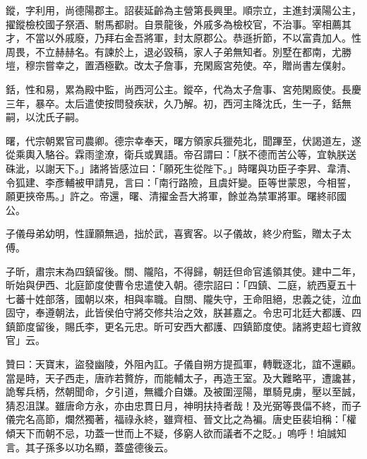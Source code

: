 \begin{pinyinscope}
 鏦，字利用，尚德陽郡主。詔裴延齡為主營第長興里。順宗立，主進封漢陽公主，擢鏦檢校國子祭酒、駙馬都尉。自景龍後，外戚多為檢校官，不治事。宰相薦其才，不當以外戚廢，乃拜右金吾將軍，封太原郡公。恭遜折節，不以富貴加人。性周畏，不立赫赫名。有諫於上，退必毀稿，家人子弟無知者。別墅在都南，尤勝塏，穆宗嘗幸之，置酒極歡。改太子詹事，充閑廄宮苑使。卒，贈尚書左僕射。



 銛，性和易，累為殿中監，尚西河公主。鏦卒，代為太子詹事、宮苑閑廄使。長慶三年，暴卒。太后遣使按問發疾狀，久乃解。初，西河主降沈氏，生一子，銛無嗣，以沈氏子嗣。



 曙，代宗朝累官司農卿。德宗幸奉天，曙方領家兵獵苑北，聞蹕至，伏謁道左，遂從乘輿入駱谷。霖雨塗潦，衛兵或異語。帝召謂曰：「朕不德而苦公等，宜執朕送硃泚，以謝天下。」諸將皆感泣曰：「願死生從陛下。」時曙與功臣子李昇、韋清、令狐建、李彥輔被甲請見，言曰：「南行路險，且虞奸變。臣等世蒙恩，今相誓，願更挾帝馬。」許之。帝還，曙、清擢金吾大將軍，餘並為禁軍將軍。曙終祁國公。



 子儀母弟幼明，性謹願無過，拙於武，喜賓客。以子儀故，終少府監，贈太子太傅。



 子昕，肅宗末為四鎮留後。關、隴陷，不得歸，朝廷但命官遙領其使。建中二年，昕始與伊西、北庭節度使曹令忠遣使入朝。德宗詔曰：「四鎮、二庭，統西夏五十七蕃十姓部落，國朝以來，相與率職。自關、隴失守，王命阻絕，忠義之徒，泣血固守，奉遵朝法，此皆侯伯守將交修共治之效，朕甚嘉之。令忠可北廷大都護、四鎮節度留後，賜氏李，更名元忠。昕可安西大都護、四鎮節度使。諸將吏超七資敘官」云。



 贊曰：天寶末，盜發幽陵，外阻內訌。子儀自朔方提孤軍，轉戰逐北，誼不還顧。當是時，天子西走，唐祚若贅斿，而能輔太子，再造王室。及大難略平，遭讒甚，詭奪兵柄，然朝聞命，夕引道，無纖介自嫌。及被圍涇陽，單騎見虜，壓以至誠，猜忍沮謀。雖唐命方永，亦由忠貫日月，神明扶持者哉！及光弼等畏偪不終，而子儀完名高節，爛然獨著，福祿永終，雖齊桓、晉文比之為褊。唐史臣裴垍稱：「權傾天下而朝不忌，功蓋一世而上不疑，侈窮人欲而議者不之貶。」嗚呼！垍誠知言。其子孫多以功名顯，蓋盛德後云。



\end{pinyinscope}